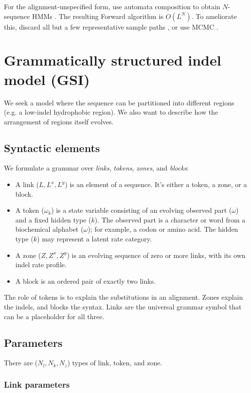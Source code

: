 \documentclass{article}
\begin{document}
For the alignment-unspecified form, use automata composition to obtain $N$-sequence HMMs \cite{SilvestreRyanEtAl2020}.
The resulting Forward algorithm is $O(L^N)$.
To ameliorate this, discard all but a few representative sample paths \cite{WestessonEtAl2012},
or use MCMC \cite{RedelingsSuchard2007}.


\section{Grammatically structured indel model (GSI)}

We seek a model where the sequence can be partitioned into different regions (e.g. a low-indel hydrophobic region).
We also want to describe how the arrangement of regions itself evolves.

\subsection{Syntactic elements}

We formulate a grammar over {\em links}, {\em tokens}, {\em zones}, and {\em blocks}:
\begin{itemize}
\item A link ($L,L^x,L^y$) is an element of a sequence. It's either a token, a zone, or a block.
\item A token ($\omega_k$) is a state variable consisting of an evolving observed part ($\omega$) and a fixed hidden type ($k$).
  The observed part is a character or word from a biochemical alphabet ($\omega$); for example, a codon or amino acid.
  The hidden type ($k$) may represent a latent rate category.
\item A zone ($Z,Z^x,Z^y$) is an evolving sequence of zero or more links, with its own indel rate profile.
\item A block is an ordered pair of exactly two links.
\end{itemize}

The role of tokens is to explain the substitutions in an alignment.
Zones explain the indels, and blocks the syntax.
Links are the universal grammar symbol that can be a placeholder for all three.

\subsection{Parameters}

There are ($N_l,N_k,N_z$) types of link, token, and zone.

\subsubsection{Link parameters}
\end{document}

